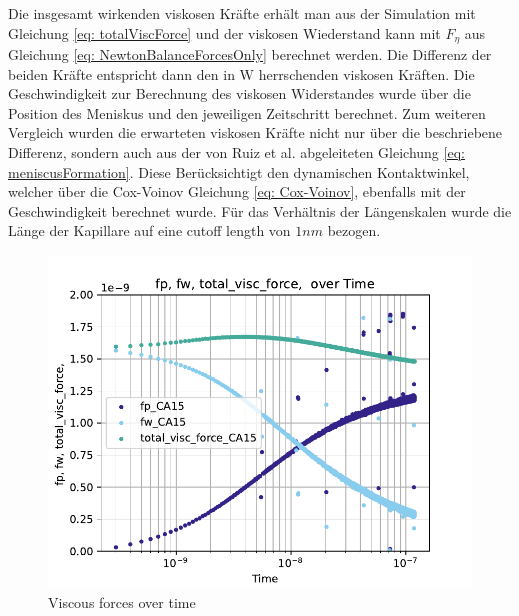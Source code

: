 Die insgesamt wirkenden viskosen Kräfte erhält man aus der Simulation mit Gleichung \ref{eq: totalViscForce} und der viskosen Wiederstand kann mit $F_{\eta}$ aus Gleichung \ref{eq: NewtonBalanceForcesOnly} berechnet werden. Die Differenz der beiden Kräfte entspricht dann den in $\mathrm{W}$ herrschenden viskosen Kräften. 
Die Geschwindigkeit zur Berechnung des viskosen Widerstandes wurde über die Position des Meniskus und den jeweiligen Zeitschritt berechnet. Zum weiteren Vergleich wurden die erwarteten viskosen Kräfte nicht nur über die beschriebene Differenz, sondern auch aus der von Ruiz et al. \cite{ruiz-gutierrez2022LongCrossoverDynamics} abgeleiteten Gleichung \ref*{eq: meniscusFormation}. Diese Berücksichtigt den dynamischen Kontaktwinkel, welcher über die Cox-Voinov Gleichung \ref*{eq: Cox-Voinov}, ebenfalls mit der Geschwindigkeit berechnet wurde. Für das Verhältnis der Längenskalen wurde die Länge der Kapillare auf eine cutoff length von $1 nm$ bezogen.

\begin{figure}[h]
    \centering
    \includegraphics[width=.95\textwidth]{Pictures/loglog_fp_fw_total_visc_force_overTime.pdf}
    \caption{Viscous forces over time}
    \label{fig: forcesOverTime}
\end{figure}

